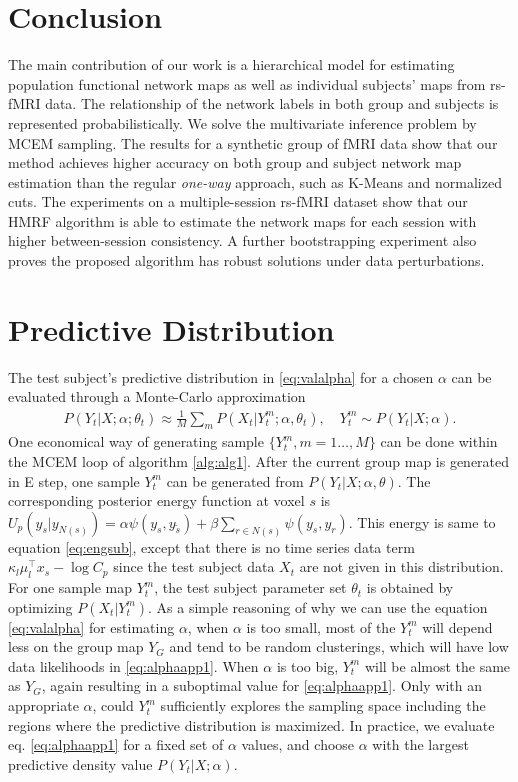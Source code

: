 \documentclass[review,authoryear]{elsarticle}
\begin{document}
\section{Conclusion}
The main contribution of our work is a hierarchical model for estimating
population functional network maps as well as individual subjects' maps from
rs-fMRI data. The relationship of the network labels in both group and subjects
is represented probabilistically. We solve the multivariate inference problem by
MCEM sampling.  The results for a synthetic group of fMRI data show that our
method achieves higher accuracy on both group and subject network map estimation
than the regular \emph{one-way} approach, such as K-Means and normalized
cuts. The experiments on a multiple-session rs-fMRI dataset show that our HMRF
algorithm is able to estimate the network maps for each session with higher
between-session consistency. A further bootstrapping experiment also proves the
proposed algorithm has robust solutions under data perturbations.

\appendix
\section{Predictive Distribution}
\label{sec:appalpha}
The test subject's predictive distribution in \eqref{eq:valalpha} for a chosen
$\alpha$ can be evaluated through a Monte-Carlo approximation
\begin{align}
P(Y_t|X; \alpha; \theta_t) \approx \frac{1}{M}\sum_m P(X_t|Y_t^m; \alpha, \theta_t), \quad Y_t^m \sim P(Y_t|X; \alpha). \label{eq:alphaapp1}
\end{align}
One economical way of generating sample $\{Y_t^m, m = 1\dots, M\}$ can be done
within the MCEM loop of algorithm \ref{alg:alg1}. After the current group map is
generated in E step, one sample $Y_t^m$ can be generated from $P(Y_t|X; \alpha,
\theta)$. The corresponding posterior energy function at voxel $s$ is $U_p
(y_s|y_{ N(s)}) = \alpha \psi(y_s,y_{\tilde s}) + \beta\sum_{r\in N(s)} \psi
(y_s, y_r)$. This energy is same to equation \eqref{eq:engsub}, except that
there is no time series data term $\kappa_l \mu_l^{\intercal} x_s - \log C_p$
since the test subject data $X_t$ are not given in this distribution.  For one
sample map $Y_t^m$, the test subject parameter set $\theta_t$ is obtained by
optimizing $P(X_t | Y_t^m)$. As a simple reasoning of why we can use the equation
\eqref{eq:valalpha} for estimating $\alpha$, when $\alpha$ is too small, most of
the $Y_t^m$ will depend less on the group map $Y_G$ and tend to be random
clusterings, which will have low data likelihoods in \eqref{eq:alphaapp1}. When
$\alpha$ is too big, $Y_t^m$ will be almost the same as $Y_G$, again resulting
in a suboptimal value for \eqref{eq:alphaapp1}. Only with an appropriate
$\alpha$, could $Y_t^m$ sufficiently explores the sampling space including the
regions where the predictive distribution is maximized. In practice, we evaluate
eq. \eqref{eq:alphaapp1} for a fixed set of $\alpha$ values, and choose $\alpha$
with the largest predictive density value $P(Y_t|X; \alpha)$.



\end{document}
